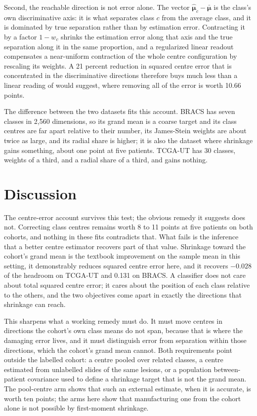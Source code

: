 \documentclass[11pt]{article}
\begin{document}
Second, the reachable direction is not error alone. The vector $\hat{\boldsymbol\mu}_c-\bar{\boldsymbol\mu}$ is the class's own discriminative axis: it is what separates class $c$ from the average class, and it is dominated by true separation rather than by estimation error. Contracting it by a factor $1-w_c$ shrinks the estimation error along that axis and the true separation along it in the same proportion, and a regularized linear readout compensates a near-uniform contraction of the whole centre configuration by rescaling its weights. A 21 percent reduction in squared centre error that is concentrated in the discriminative directions therefore buys much less than a linear reading of \citet{queisler2026centreError} would suggest, where removing all of the error is worth 10.66 points.

The difference between the two datasets fits this account. BRACS has seven classes in 2,560 dimensions, so its grand mean is a coarse target and its class centres are far apart relative to their number, its James-Stein weights are about twice as large, and its radial share is higher; it is also the dataset where shrinkage gains something, about one point at five patients. TCGA-UT has 30 classes, weights of a third, and a radial share of a third, and gains nothing.

\section{Discussion}
\label{sec:discussion}
The centre-error account survives this test; the obvious remedy it suggests does not. Correcting class centres remains worth 8 to 11 points at five patients on both cohorts, and nothing in these fits contradicts that. What fails is the inference that a better centre estimator recovers part of that value. Shrinkage toward the cohort's grand mean is the textbook improvement on the sample mean in this setting, it demonstrably reduces squared centre error here, and it recovers $-0.028$ of the headroom on TCGA-UT and 0.131 on BRACS. A classifier does not care about total squared centre error; it cares about the position of each class relative to the others, and the two objectives come apart in exactly the directions that shrinkage can reach.

This sharpens what a working remedy must do. It must move centres in directions the cohort's own class means do not span, because that is where the damaging error lives, and it must distinguish error from separation within those directions, which the cohort's grand mean cannot. Both requirements point outside the labelled cohort: a centre pooled over related classes, a centre estimated from unlabelled slides of the same lesions, or a population between-patient covariance used to define a shrinkage target that is not the grand mean. The pool-centre arm shows that such an external estimate, when it is accurate, is worth ten points; the arms here show that manufacturing one from the cohort alone is not possible by first-moment shrinkage.
\end{document}
